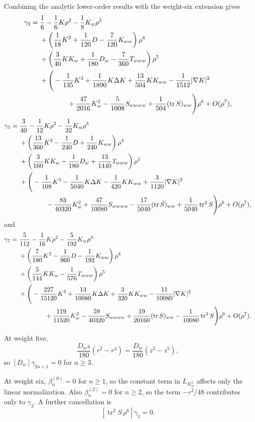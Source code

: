 \documentclass[11pt]{article}
\theoremstyle{definition}
\theoremstyle{remark}
\newcommand{\tr}{\operatorname{tr}}
\begin{document}
Combining the analytic lower-order results with the weight-six extension gives
\[
\begin{aligned}
\gamma_3={}&
\frac16-\frac16K\rho^2-\frac18K_w\rho^3
\\
&+\left(\frac1{18}K^2+\frac1{120}D-\frac7{120}K_{ww}\right)\rho^4
\\
&+\left(\frac3{40}KK_w+\frac1{180}D_w-\frac7{360}T_{www}\right)\rho^5
\\
&+\Bigg(
-\frac1{135}K^3+\frac1{1890}K\Delta K+\frac{13}{504}KK_{ww}
-\frac1{1512}|\nabla K|^2
\\
&\hspace{1.4cm}
+\frac{47}{2016}K_w^2-\frac5{1008}S_{wwww}
+\frac1{504}(\tr S)_{ww}
\Bigg)\rho^6+O(\rho^7),
\end{aligned}
\]
\[
\begin{aligned}
\gamma_5={}&
\frac3{40}-\frac1{12}K\rho^2-\frac1{32}K_w\rho^3
\\
&+\left(\frac{13}{360}K^2-\frac1{240}D+\frac1{240}K_{ww}\right)\rho^4
\\
&+\left(\frac3{160}KK_w-\frac1{180}D_w+\frac{13}{1440}T_{www}\right)\rho^5
\\
&+\Bigg(
-\frac1{108}K^3-\frac1{5040}K\Delta K-\frac1{420}KK_{ww}
+\frac3{1120}|\nabla K|^2
\\
&\hspace{1.4cm}
-\frac{83}{40320}K_w^2+\frac{47}{10080}S_{wwww}
-\frac{17}{5040}(\tr S)_{ww}+\frac1{5040}\tr^2S
\Bigg)\rho^6+O(\rho^7),
\end{aligned}
\]
and
\[
\begin{aligned}
\gamma_7={}&
\frac5{112}-\frac1{16}K\rho^2-\frac5{192}K_w\rho^3
\\
&+\left(\frac7{180}K^2-\frac1{960}D-\frac1{192}K_{ww}\right)\rho^4
\\
&+\left(\frac5{144}KK_w-\frac1{576}T_{www}\right)\rho^5
\\
&+\Bigg(
-\frac{227}{15120}K^3+\frac{13}{10080}K\Delta K+\frac3{320}KK_{ww}
-\frac{11}{10080}|\nabla K|^2
\\
&\hspace{1.4cm}
+\frac{119}{11520}K_w^2-\frac{59}{40320}S_{wwww}
+\frac{19}{20160}(\tr S)_{ww}-\frac1{10080}\tr^2S
\Bigg)\rho^6+O(\rho^7).
\end{aligned}
\]

At weight five,
\[
\frac{D_wz}{180}(r^2-r^4)=\frac{D_w}{180}(z^3-z^5),
\]
so \([D_w]\gamma_{2n+1}=0\) for \(n\ge3\).

At weight six, \(\beta_n^{(0)}=0\) for \(n\ge1\), so the constant term in
\(L_{K_w^2}\) affects only the linear normalization.  Also
\(\beta_n^{(2)}=0\) for \(n\ge2\), so the term \(-r^2/48\) contributes only
to \(\gamma_3\).  A further cancellation is
\[
[\tr^2S\,\rho^6]\gamma_3=0.
\]
\end{document}
